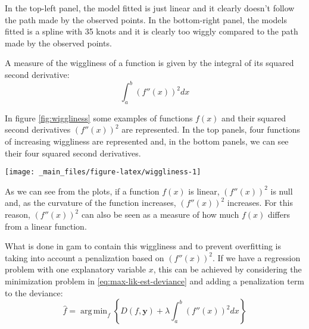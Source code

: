 \documentclass[a4paper, twoside, openright, 12pt]{report}
\let\origfigure\figure
\let\endorigfigure\endfigure
\renewenvironment{figure}[1][2] {
  \expandafter\origfigure\expandafter[!hbtp]
} {
  \endorigfigure
}
\DeclareMathOperator*{\argmin}{arg\,min}  %
\theoremstyle{definition}
\theoremstyle{definition}
\theoremstyle{definition}
\theoremstyle{remark}
\begin{document}
In the top-left panel, the model fitted is just linear and it clearly doesn't follow the path made by the observed points. In the bottom-right panel, the models fitted is a spline with 35 knots and it is clearly too wiggly compared to the path made by the observed points.

A measure of the wiggliness of a function is given by the integral of its squared second derivative:
\begin{equation}
\label{eq:wiggliness}
\int_{a}^{b}{\left( f''(x) \right)^2 dx}
\end{equation}

In figure \ref{fig:wiggliness} some examples of functions \(f(x)\) and their squared second derivatives \(\left(f''(x)\right)^2\) are represented. In the top panels, four functions of increasing wiggliness are represented and, in the bottom panels, we can see their four squared second derivatives.





\begin{figure}[!hbtp]

{\centering \texttt{[image: \_main\_files/figure-latex/wiggliness-1]} 

}

\caption[Squared second derivative \(\left(f''(x)\right)^2\) for functions with different wiggliness.]{Squared second derivative \(\left(f''(x)\right)^2\) for functions with different wiggliness. The wigglier the function \(f(x)\) is, the higher \(\left(f''(x)\right)^2\) is.}\label{fig:wiggliness}
\end{figure}

As we can see from the plots, if a function \(f(x)\) is linear, \(\left(f''(x)\right)^2\) is null and, as the curvature of the function increases, \(\left(f''(x)\right)^2\) increases. For this reason, \(\left(f''(x)\right)^2\) can also be seen as a measure of how much \(f(x)\) differs from a linear function.

What is done in \ac{gam} to contain this wiggliness and to prevent overfitting is taking into account a penalization based on \(\left(f''(x)\right)^2\). If we have a regression problem with one explanatory variable \(x\), this can be achieved by considering the minimization problem in \eqref{eq:max-lik-est-deviance} and adding a penalization term to the deviance:
\begin{equation}
\label{eq:gam-est-deviance}
\hat{f} = \argmin_{f}{\left\{D(f, \boldsymbol{y}) + \lambda \int_{a}^{b}{\left( f''(x) \right)^2 dx}\right\}}
\end{equation}
\end{document}
